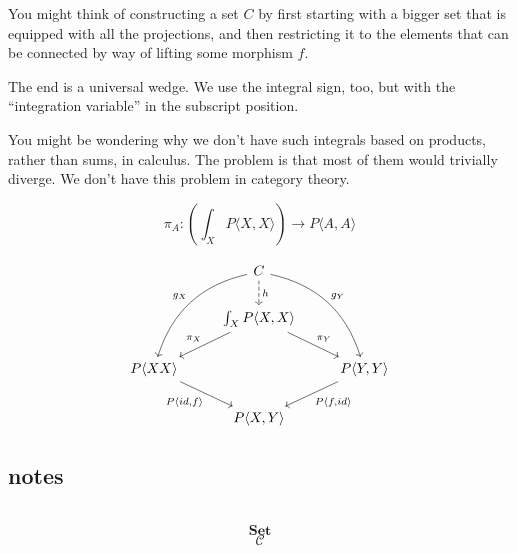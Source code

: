 \documentclass[DaoFP]{subfiles}
\begin{document}
You might think of constructing a set $C$ by first starting with a bigger set that is equipped with all the projections, and then restricting it to the elements that can be connected by way of lifting some morphism $f$. 

The end is a universal wedge. We use the integral sign, too, but with the ``integration variable'' in the subscript position. 

You might be wondering why we don't have such integrals based on products, rather than sums, in calculus. The problem is that most of them would trivially diverge. We don't have this problem in category theory. 

\[ \pi_A \colon \left( \int_X P \langle X, X \rangle \right) \to P \langle A, A \rangle \]

\[
 \begin{tikzcd}
 &C
 \arrow[ddl, bend right, "g_X"']
 \arrow[ddr, bend left, "g_Y"]
 \arrow[d, dashed, "h"]
 \\
 & \int_X P \langle X, X \rangle
 \arrow[ld, "\pi_X"']
 \arrow[rd, "\pi_Y"]
 \\
 P \langle X X \rangle
 \arrow[dr, "{P \langle id, f \rangle}"']
 &&P \langle Y, Y \rangle
 \arrow[dl, "{P \langle f, id \rangle}"]
 \\
 & P \langle X, Y \rangle
 \end{tikzcd}
\]



\subsection{notes}

\begin{exercise}
\end{exercise}

\begin{haskell}
\end{haskell}

\[
 \begin{tikzcd}
  \end{tikzcd}
\]

\[   \mathbf{Set} \]
\[   \mathcal{C} \]
\end{document}
